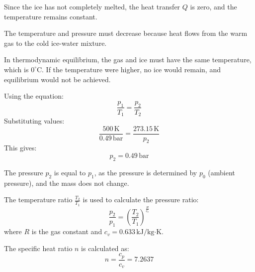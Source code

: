 Since the ice has not completely melted, the heat transfer \( Q \) is zero, and the temperature remains constant.  

The temperature and pressure must decrease because heat flows from the warm gas to the cold ice-water mixture.  

In thermodynamic equilibrium, the gas and ice must have the same temperature, which is \( 0^\circ\text{C} \). If the temperature were higher, no ice would remain, and equilibrium would not be achieved.  

Using the equation:  
\[
\frac{p_1}{T_1} = \frac{p_2}{T_2}
\]  
Substituting values:  
\[
\frac{500 \, \text{K}}{0.49 \, \text{bar}} = \frac{273.15 \, \text{K}}{p_2}
\]  
This gives:  
\[
p_2 = 0.49 \, \text{bar}
\]

The pressure \( p_2 \) is equal to \( p_1 \), as the pressure is determined by \( p_0 \) (ambient pressure), and the mass does not change.  

The temperature ratio \( \frac{T_2}{T_1} \) is used to calculate the pressure ratio:  
\[
\frac{p_2}{p_1} = \left( \frac{T_2}{T_1} \right)^{\frac{R}{c_v}}
\]  
where \( R \) is the gas constant and \( c_v = 0.633 \, \text{kJ/kg·K} \).  

The specific heat ratio \( n \) is calculated as:  
\[
n = \frac{c_p}{c_v} = 7.2637
\]